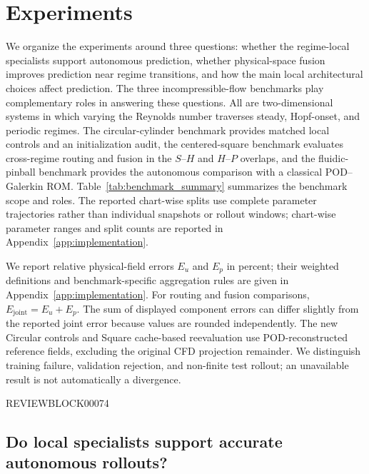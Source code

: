 \documentclass{article}
\begin{document}
\section{Experiments}
\label{sec:experiments}

We organize the experiments around three questions: whether the regime-local specialists support autonomous prediction, whether
physical-space fusion improves prediction near regime transitions, and how the main local architectural choices affect prediction.
The three incompressible-flow benchmarks play complementary roles in answering these questions. All are two-dimensional systems in which varying the Reynolds number traverses steady, Hopf-onset, and periodic regimes. The circular-cylinder benchmark provides matched local controls and an initialization audit, the centered-square benchmark evaluates cross-regime routing and fusion in the $S$--$H$ and $H$--$P$ overlaps, and the fluidic-pinball benchmark provides the autonomous comparison with a classical POD--Galerkin ROM. Table~\ref{tab:benchmark_summary} summarizes the benchmark scope and roles. The reported chart-wise splits use complete parameter trajectories rather than individual snapshots or rollout windows; chart-wise parameter ranges and split counts are reported in Appendix~\ref{app:implementation}.

We report relative physical-field errors $E_u$ and $E_p$ in percent; their weighted definitions and benchmark-specific aggregation rules are given in Appendix~\ref{app:implementation}. For routing and fusion comparisons, $E_{\mathrm{joint}}=E_u+E_p$. The sum of displayed component errors can differ slightly from the reported joint error because values are rounded independently. The new Circular controls and Square cache-based reevaluation use
POD-reconstructed reference fields, excluding the original CFD projection
remainder. We distinguish training failure, validation rejection, and
non-finite test rollout; an unavailable result is not automatically a
divergence. 

\par


REVIEWBLOCK00074


\par



\subsection{Do local specialists support accurate autonomous rollouts?}
\end{document}
